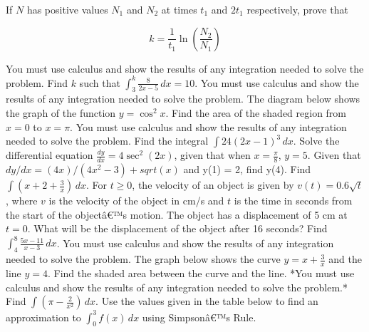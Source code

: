 \documentclass[12pt,addpoints]{exam}
\begin{document}
\begin{questions}
If \( N \) has positive values \( N_1 \) and \( N_2 \) at times \( t_1 \) and \( 2t_1 \) respectively, prove that

\[
k = \frac{1}{t_1} \ln \left( \frac{N_2}{N_1} \right)
\]

You must use calculus and show the results of any integration needed to solve the problem.
\fillwithlines{5cm}
\question[5] Find \( k \) such that \(\int_{3}^{k} \frac{8}{2x-5} \, dx = 10\). You must use calculus and show the results of any integration needed to solve the problem.
\fillwithlines{5cm}
\question[5] The diagram below shows the graph of the function \( y = \cos^2 x \). Find the area of the shaded region from \( x = 0 \) to \( x = \pi \). You must use calculus and show the results of any integration needed to solve the problem.
\fillwithlines{5cm}
\question[5] Find the integral \(\int 24(2x-1)^3 \, dx\).
\fillwithlines{5cm}
\question[5] Solve the differential equation \( \frac{dy}{dx} = 4 \sec^2(2x) \), given that when \( x = \frac{\pi}{8} \), \( y = 5 \).
\fillwithlines{5cm}
\question[5] Given that \(dy/dx = (4x)/(4x^2 - 3) + sqrt(x)\) and y(1) = 2, find y(4).
\fillwithlines{5cm}
\question[5] Find \(\int \left( x + 2 + \frac{3}{x} \right) \, dx\).
\fillwithlines{5cm}
\question[5] For \(t \geq 0\), the velocity of an object is given by \(v(t) = 0.6 \sqrt{t}\), where \(v\) is the velocity of the object in cm/s and \(t\) is the time in seconds from the start of the objectâ€™s motion. The object has a displacement of 5 cm at \(t = 0\). What will be the displacement of the object after 16 seconds?
\fillwithlines{5cm}
\question[5] Find \(\int_{4}^{8} \frac{5x - 11}{x - 3} \, dx\). You must use calculus and show the results of any integration needed to solve the problem.
\fillwithlines{5cm}
\question[5] The graph below shows the curve \( y = x + \frac{3}{x} \) and the line \( y = 4 \). Find the shaded area between the curve and the line. *You must use calculus and show the results of any integration needed to solve the problem.*
\fillwithlines{5cm}
\question[5] Find \(\int \left( \pi - \frac{2}{x^2} \right) \, dx\).
\fillwithlines{5cm}
\question[5] Use the values given in the table below to find an approximation to \(\int_0^3 f(x) \, dx\) using Simpsonâ€™s Rule.


\end{questions}
\end{document}
